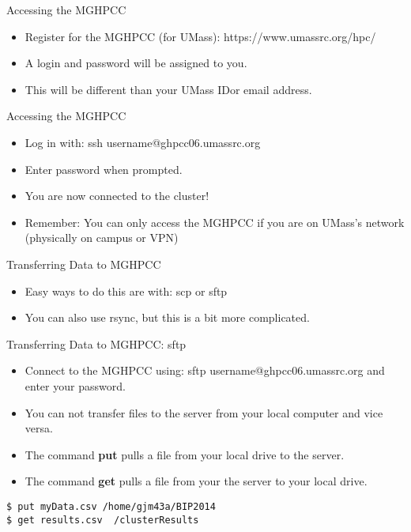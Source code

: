 \documentclass[table]{beamer}\usepackage[]{graphicx}\usepackage[]{color}
\begin{document}
\begin{frame}{Accessing the MGHPCC}
\begin{itemize}
\item Register for the MGHPCC (for UMass): https://www.umassrc.org/hpc/
\item A login and password will be assigned to you. 
\item This will be different than your UMass IDor email address.
\end{itemize}
\end{frame}


\begin{frame}{Accessing the MGHPCC}
\begin{itemize}
\item Log in with: ssh username@ghpcc06.umassrc.org
\item Enter password when prompted.  
\item You are now connected to the cluster!
\item Remember: You can only access the MGHPCC if you are on UMass's network (physically on campus or VPN)
\end{itemize}
\end{frame}

\begin{frame}{Transferring Data to MGHPCC}
\begin{itemize}
\item Easy ways to do this are with: scp or sftp
\item You can also use rsync, but this is a bit more complicated.
\end{itemize}
\end{frame}


\begin{frame}{Transferring Data to MGHPCC: sftp}
\begin{itemize}
\item Connect to the MGHPCC using: sftp username@ghpcc06.umassrc.org and enter your password.  
\item You can not transfer files to the server from your local computer and vice versa.  
\item The command {\bf put} pulls a file from your local drive to the server.
\item The command {\bf get} pulls a file from your the server to your local drive.
\end{itemize}
{\tt \$ put myData.csv /home/gjm43a/BIP2014}\\
{\tt \$ get results.csv ~/clusterResults}
\end{frame}
\end{document}
